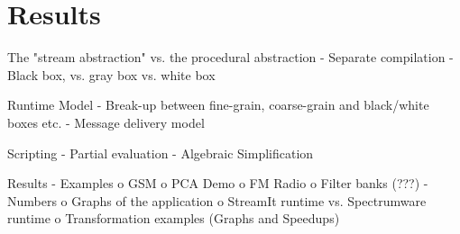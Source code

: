 \section{Results}

The "stream abstraction" vs. the procedural abstraction
-	Separate compilation
-	Black box, vs. gray box vs. white box

Runtime Model
-	Break-up between fine-grain, coarse-grain and black/white boxes etc.
-	Message delivery model

Scripting
-	Partial evaluation
-	Algebraic Simplification 
 
Results
-	Examples
o	GSM
o	PCA Demo
o	FM Radio
o	Filter banks (???)
-	Numbers
o	Graphs of the application
o	StreamIt runtime vs. Spectrumware runtime
o	Transformation examples (Graphs and Speedups)


